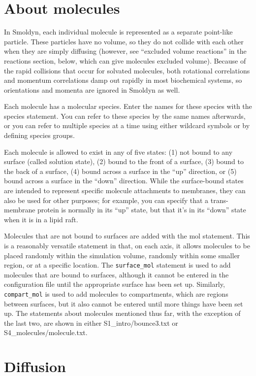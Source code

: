 \documentclass {book}
\newcommand {\ttt} {\texttt}
\begin{document}
\section{About molecules}

In Smoldyn, each individual molecule is represented as a separate point-like particle. These particles have no volume, so they do not collide with each other when they are simply diffusing (however, see ``excluded volume reactions'' in the reactions section, below, which can give molecules excluded volume). Because of the rapid collisions that occur for solvated molecules, both rotational correlations and momentum correlations damp out rapidly in most biochemical systems, so orientations and momenta are ignored in Smoldyn as well.

Each molecule has a molecular species. Enter the names for these species with the species statement. You can refer to these species by the same names afterwards, or you can refer to multiple species at a time using either wildcard symbols or by defining species groups.

Each molecule is allowed to exist in any of five states: (1) not bound to any surface (called solution state), (2) bound to the front of a surface, (3) bound to the back of a surface, (4) bound across a surface in the ``up'' direction, or (5) bound across a surface in the ``down'' direction. While the surface-bound states are intended to represent specific molecule attachments to membranes, they can also be used for other purposes; for example, you can specify that a trans-membrane protein is normally in its ``up'' state, but that it's in its ``down'' state when it is in a lipid raft.

Molecules that are not bound to surfaces are added with the mol statement. This is a reasonably versatile statement in that, on each axis, it allows molecules to be placed randomly within the simulation volume, randomly within some smaller region, or at a specific location. The \ttt{surface\_mol} statement is used to add molecules that are bound to surfaces, although it cannot be entered in the configuration file until the appropriate surface has been set up. Similarly, \ttt{compart\_mol} is used to add molecules to compartments, which are regions between surfaces, but it also cannot be entered until more things have been set up. The statements about molecules mentioned thus far, with the exception of the last two, are shown in either S1\_intro/bounce3.txt or S4\_molecules/molecule.txt.

\section{Diffusion}
\end{document}
